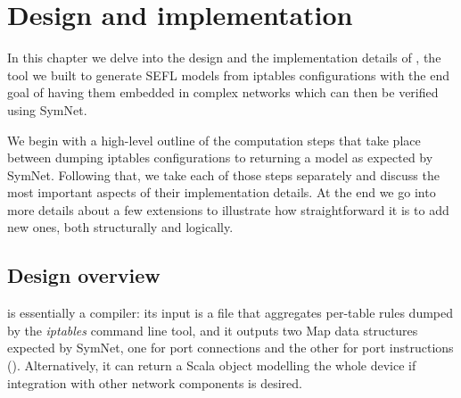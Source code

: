 \chapter{Design and implementation}
In this chapter we delve into the design and the implementation details of
\TOOL, the tool we built to generate SEFL models from iptables configurations
with the end goal of having them embedded in complex networks which can then be
verified using SymNet.

We begin with a high-level outline of the computation steps that take place
between dumping iptables configurations to returning a model as expected by
SymNet.  Following that, we take each of those steps separately and discuss the
most important aspects of their implementation details.  At the end we go into
more details about a few extensions to illustrate how straightforward it is to
add new ones, both structurally and logically.


\section{Design overview}

\TOOL is essentially a compiler: its input is a file that aggregates per-table
rules dumped by the \emph{iptables} command line tool, and it outputs two Map
data structures expected by SymNet, one for port connections and the other for
port instructions ().  Alternatively,
it can return a Scala object modelling the whole device if integration with
other network components is desired.

